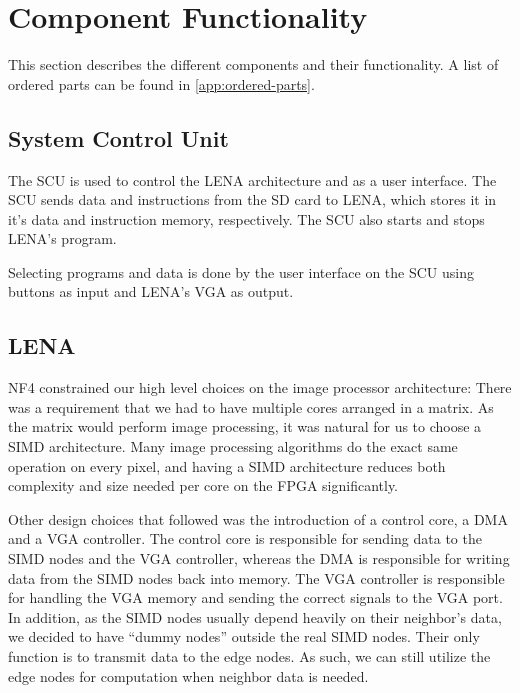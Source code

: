 \section{Component Functionality}

This section describes the different components and their functionality. A list
of ordered parts can be found in \ref{app:ordered-parts}.

\subsection{System Control Unit}

The \acf{SCU} is used to control the \ac{LENA} architecture and as a user
interface.  The SCU sends data and instructions from the \ac{SD} card to
\ac{LENA}, which stores it in it's data and instruction memory,
respectively. The \ac{SCU} also starts and stops \ac{LENA}'s program.

Selecting programs and data is done by the user interface on the \ac{SCU} using
buttons as input and \ac{LENA}'s VGA as output.

\subsection{LENA}

NF4 constrained our high level choices on the image processor architecture:
There was a requirement that we had to have multiple cores arranged in a
matrix. As the matrix would perform image processing, it was natural for us to
choose a \ac{SIMD} architecture. Many image processing algorithms do the exact
same operation on every pixel, and having a \ac{SIMD} architecture reduces both
complexity and size needed per core on the \ac{FPGA} significantly.

Other design choices that followed was the introduction of a control core, a
\ac{DMA} and a \ac{VGA} controller. The control core is responsible for sending
data to the \ac{SIMD} nodes and the \ac{VGA} controller, whereas the \ac{DMA} is
responsible for writing data from the \ac{SIMD} nodes back into memory. The
\ac{VGA} controller is responsible for handling the \ac{VGA} memory and sending
the correct signals to the \ac{VGA} port. In addition, as the \ac{SIMD} nodes
usually depend heavily on their neighbor's data, we decided to have ``dummy
nodes'' outside the real \ac{SIMD} nodes. Their only function is to transmit
data to the edge nodes. As such, we can still utilize the edge nodes for
computation when neighbor data is needed.
